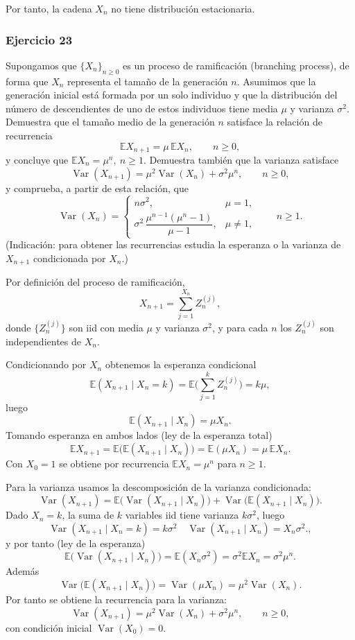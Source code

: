 Por tanto, la cadena $X_n$ no tiene distribución estacionaria.
\subsubsection{Ejercicio 23}
\begin{exercise}
Supongamos que $\{X_n\}_{n\ge0}$ es un proceso de ramificación (branching process), de forma que $X_n$ representa el tamaño de la generación $n$. Asumimos que la generación inicial está formada por un solo individuo y que la distribución del número de descendientes de uno de estos individuos tiene media $\mu$ y varianza $\sigma^2$. Demuestra que el tamaño medio de la generación $n$ satisface la relación de recurrencia
\[
\mathbb{E}X_{n+1}=\mu\,\mathbb{E}X_n,\qquad n\ge0,
\]
y concluye que $\mathbb{E}X_n=\mu^n,\ n\ge1$. Demuestra también que la varianza satisface
\[
\operatorname{Var}(X_{n+1})=\mu^2\operatorname{Var}(X_n)+\sigma^2\mu^n,\qquad n\ge0,
\]
y comprueba, a partir de esta relación, que
\[
\operatorname{Var}(X_n)=
\begin{cases}
n\sigma^2, & \mu=1,\\[6pt]
\sigma^2\,\dfrac{\mu^{n-1}(\mu^n-1)}{\mu-1}, & \mu\neq1,
\end{cases}\qquad n\ge1.
\]
(Indicación: para obtener las recurrencias estudia la esperanza o la varianza de $X_{n+1}$ condicionada por $X_n$.)
\end{exercise}


Por definición del proceso de ramificación,
\[
X_{n+1}=\sum_{j=1}^{X_n} Z_n^{(j)},
\]
donde $\{Z_n^{(j)}\}$ son iid con media $\mu$ y varianza $\sigma^2$, y para cada $n$ los $Z_n^{(j)}$ son independientes de $X_n$.

Condicionando por $X_n$ obtenemos la esperanza condicional
\[
\mathbb{E}(X_{n+1}\mid X_n=k)=\mathbb{E}\Big(\sum_{j=1}^k Z_n^{(j)}\Big)=k\mu,
\]
luego
\[
\mathbb{E}(X_{n+1}\mid X_n)=\mu X_n.
\]
Tomando esperanza en ambos lados (ley de la esperanza total)
\[
\mathbb{E}X_{n+1}=\mathbb{E}\big(\mathbb{E}(X_{n+1}\mid X_n)\big)=\mathbb{E}(\mu X_n)=\mu\,\mathbb{E}X_n.
\]
Con $X_0=1$ se obtiene por recurrencia $\mathbb{E}X_n=\mu^n$ para $n\ge1$.

Para la varianza usamos la descomposición de la varianza condicionada:
\[
\operatorname{Var}(X_{n+1})=\mathbb{E}\big(\operatorname{Var}(X_{n+1}\mid X_n)\big)+\operatorname{Var}\big(\mathbb{E}(X_{n+1}\mid X_n)\big).
\]
Dado $X_n=k$, la suma de $k$ variables iid tiene varianza $k\sigma^2$, luego
\[
\operatorname{Var}(X_{n+1}\mid X_n=k)=k\sigma^2 \quad \operatorname{Var}(X_{n+1}\mid X_n)=X_n\sigma^2.,
\]
y por tanto (ley de la esperanza)
\[
\mathbb{E}\big(\operatorname{Var}(X_{n+1}\mid X_n)\big)=\mathbb{E}(X_n\sigma^2)=\sigma^2\mathbb{E}X_n=\sigma^2\mu^n.
\]
Además
\[
\operatorname{Var}\big(\mathbb{E}(X_{n+1}\mid X_n)\big)=\operatorname{Var}(\mu X_n)=\mu^2\operatorname{Var}(X_n).
\]
Por tanto se obtiene la recurrencia para la varianza:
\[
\operatorname{Var}(X_{n+1})=\mu^2\operatorname{Var}(X_n)+\sigma^2\mu^n,\qquad n\ge0,
\]
con condición inicial $\operatorname{Var}(X_0)=0$.


